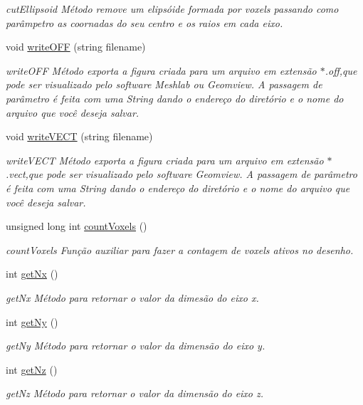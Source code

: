 \begin{DoxyCompactItemize}
\begin{DoxyCompactList}\small\item\em cut\+Ellipsoid Método remove um elipsóide formada por voxels passando como parâmpetro as coornadas do seu centro e os raios em cada eixo. \end{DoxyCompactList}\item 
void \mbox{\hyperlink{classsculptor3d_a7d9b24f6775441135936b184bb4079e0}{write\+O\+FF}} (string filename)
\begin{DoxyCompactList}\small\item\em write\+O\+FF Método exporta a figura criada para um arquivo em extensão $\ast$.off,que pode ser visualizado pelo software Meshlab ou Geomview. A passagem de parâmetro é feita com uma String dando o endereço do diretório e o nome do arquivo que você deseja salvar. \end{DoxyCompactList}\item 
void \mbox{\hyperlink{classsculptor3d_a60f471805c52556e564477beccc72f6b}{write\+V\+E\+CT}} (string filename)
\begin{DoxyCompactList}\small\item\em write\+V\+E\+CT Método exporta a figura criada para um arquivo em extensão $\ast$.vect,que pode ser visualizado pelo software Geomview. A passagem de parâmetro é feita com uma String dando o endereço do diretório e o nome do arquivo que você deseja salvar. \end{DoxyCompactList}\item 
unsigned long int \mbox{\hyperlink{classsculptor3d_a39cb80b54a93e7e2cf8b2beddd7f1b74}{count\+Voxels}} ()
\begin{DoxyCompactList}\small\item\em count\+Voxels Função auxiliar para fazer a contagem de voxels ativos no desenho. \end{DoxyCompactList}\item 
int \mbox{\hyperlink{classsculptor3d_a6f5974b59748b404ac44fef855dbf9ee}{get\+Nx}} ()
\begin{DoxyCompactList}\small\item\em get\+Nx Método para retornar o valor da dimesão do eixo x. \end{DoxyCompactList}\item 
int \mbox{\hyperlink{classsculptor3d_aa354fdd753a7567f782971893f63e05a}{get\+Ny}} ()
\begin{DoxyCompactList}\small\item\em get\+Ny Método para retornar o valor da dimensão do eixo y. \end{DoxyCompactList}\item 
int \mbox{\hyperlink{classsculptor3d_ab393938c4dfdf621eb966d73b82bf705}{get\+Nz}} ()
\begin{DoxyCompactList}\small\item\em get\+Nz Método para retornar o valor da dimensão do eixo z. \end{DoxyCompactList}\end{DoxyCompactItemize}
